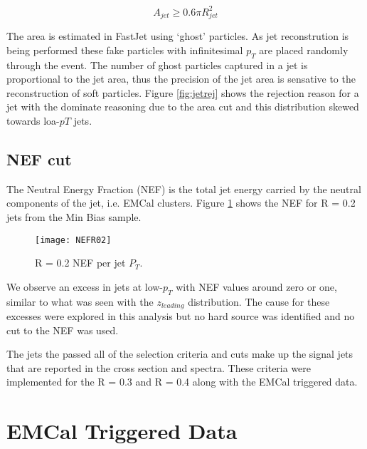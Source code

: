 \begin{equation}
A_{jet} \geq 0.6 \pi R_{jet}^{2}
\label{eq:AreaJet}
\end{equation}

The area is estimated in FastJet using `ghost' particles.  As jet reconstrution is being performed these fake particles with infinitesimal $p_{T}$ are placed randomly through the event.  The number of ghost particles captured in a jet is proportional to the jet area, thus the precision of the jet area is sensative to the reconstruction of soft particles.  Figure \ref{fig:jetrej} shows the rejection reason for a jet with the dominate reasoning due to the area cut and this distribution skewed towards loa-$p{T}$ jets.

\subsection{NEF cut}
The Neutral Energy Fraction (NEF) is the total jet energy carried by the neutral components of the jet, i.e. EMCal clusters.  Figure \ref{fig:JetNEF} shows the NEF for R = 0.2 jets from the Min Bias sample.

\begin{figure}[h]
\texttt{[image: NEFR02]}
\centering
\caption{R = 0.2 NEF per jet $P_{T}$.}
\label{fig:JetNEF}
\end{figure}
\noindent
We observe an excess in jets at low-$p_{T}$ with NEF values around zero or one, similar to what was seen with the $z_{leading}$ distribution.  The cause for these excesses were explored in this analysis but no hard source was identified and no cut to the NEF was used.

The jets the passed all of the selection criteria and cuts make up the signal jets that are reported in the cross section and spectra.  These criteria were implemented for the R = 0.3 and R = 0.4 along with the EMCal triggered data.




\section{EMCal Triggered Data}

